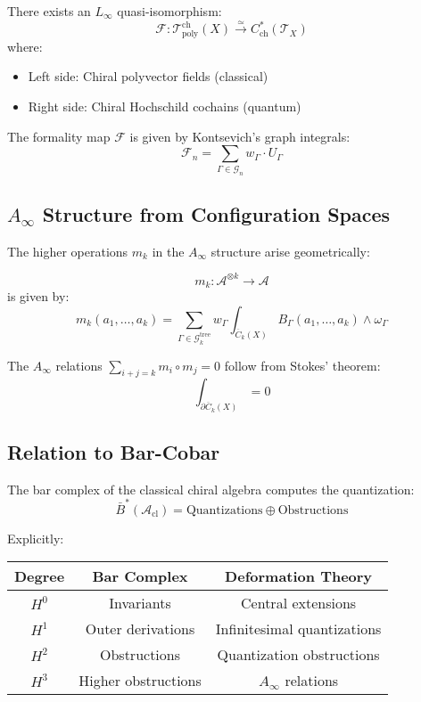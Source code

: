 \begin{theorem}
There exists an $L_\infty$ quasi-isomorphism:
$$\mathcal{F}: \mathcal{T}_{\text{poly}}^{\text{ch}}(X) \xrightarrow{\simeq} C^*_{\text{ch}}(\mathcal{T}_X)$$
where:
\begin{itemize}
\item Left side: Chiral polyvector fields (classical)
\item Right side: Chiral Hochschild cochains (quantum)
\end{itemize}
\end{theorem}

The formality map $\mathcal{F}$ is given by Kontsevich's graph integrals:
$$\mathcal{F}_n = \sum_{\Gamma \in \mathcal{G}_n} w_\Gamma \cdot U_\Gamma$$

\subsection{$A_\infty$ Structure from Configuration Spaces}

The higher operations $m_k$ in the $A_\infty$ structure arise geometrically:

\begin{proposition}
$$m_k: \mathcal{A}^{\otimes k} \to \mathcal{A}$$
is given by:
$$m_k(a_1, \ldots, a_k) = \sum_{\Gamma \in \mathcal{G}_k^{\text{tree}}} w_\Gamma \int_{\overline{C}_k(X)} B_\Gamma(a_1, \ldots, a_k) \wedge \omega_\Gamma$$
\end{proposition}

The $A_\infty$ relations $\sum_{i+j=k} m_i \circ m_j = 0$ follow from Stokes' theorem:
$$\int_{\partial \overline{C}_k(X)} = 0$$

\subsection{Relation to Bar-Cobar}

\begin{theorem}
The bar complex of the classical chiral algebra computes the quantization:
$$\bar{B}^*(\mathcal{A}_{\text{cl}}) = \text{Quantizations} \oplus \text{Obstructions}$$

Explicitly:
\begin{center}
\begin{tabular}{|c|c|c|}
\hline
Degree & Bar Complex & Deformation Theory \\
\hline
$H^0$ & Invariants & Central extensions \\
$H^1$ & Outer derivations & Infinitesimal quantizations \\
$H^2$ & Obstructions & Quantization obstructions \\
$H^3$ & Higher obstructions & $A_\infty$ relations \\
\hline
\end{tabular}
\end{center}
\end{theorem}

